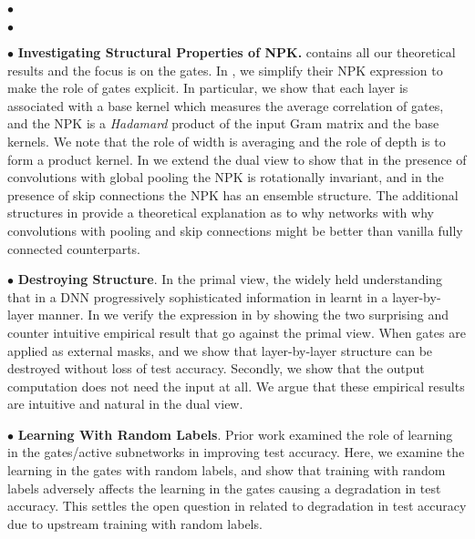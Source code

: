 \documentclass{article} %
\begin{document}
\quad$\bullet$ 

\quad$\bullet$ 

$\bullet$  \textbf{Investigating Structural Properties of NPK.}  contains all our theoretical results and the focus is on the gates. In , we simplify their NPK expression to make the role of gates explicit. In particular, we show that each layer is associated with a base kernel which measures the average correlation of gates, and the NPK is a \emph{Hadamard} product of the input Gram matrix and the base kernels. We note that the role of width is averaging and the role of depth is to form a product kernel. In  we extend the dual view to show that in the presence of convolutions with global pooling the NPK is rotationally invariant, and in the presence of skip connections the NPK has an ensemble structure. The additional structures in  provide a theoretical explanation as to why networks with why  convolutions with pooling and skip connections might be better than vanilla fully connected counterparts.



$\bullet$ \textbf{Destroying Structure}. In the primal view, the widely held understanding that in a DNN progressively sophisticated information in learnt in a layer-by-layer manner. In  we verify the expression in  by showing the two surprising and counter intuitive empirical result that go against the primal view. When gates are applied as external masks, and we show that layer-by-layer structure can be destroyed without loss of test accuracy.  Secondly, we show that the output computation does not need the input at all. We argue that these empirical results are intuitive and natural in the dual view.

$\bullet$ \textbf{Learning With Random Labels}. Prior work examined the role of learning in the gates/active subnetworks in improving test accuracy. Here, we examine the learning in the gates with random labels, and  show that  training with random labels adversely affects the learning in the gates causing a degradation in test accuracy. This settles the open question in  related to degradation in test accuracy due to upstream training with random labels.
\end{document}
